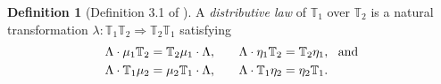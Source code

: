\documentclass[12pt,leqno]{amsart}
\theoremstyle{definition}
\newtheorem{definition}[theorem]{Definition}
\def\T{\mathbb{T}}
\newcommand{\4}{\texttt{4}}
\begin{document}
\begin{definition}[Definition 3.1 of \cite{fox-markl:ContM97}]
\label{Pujde dnes k ochotnikum?}
A {\/\em distributive law\/} of $\T_1$  over $\T_2$ is a natural
transformation   $\lambda :  \T_1   \T_2 \Rightarrow \T_2 \T_1$
satisfying
\begin{subequations}
\label{Jarka se vratila z Kolumbie.}
\begin{align}
\Lambda \cdot \mu_1\T_2 = \T_2 \mu_1 \cdot \Lambda, 
\hskip 2em
&\Lambda \cdot \eta_1\T_2 = \T_2 \eta_1, \ \hbox{ and}
\\
\Lambda \cdot \T_1\mu_2 = \mu_2 \T_1 \cdot \Lambda,
\hskip 2em
& \Lambda \cdot \T_1\eta_2 = \eta_2 \T_1.
  \end{align}
\end{subequations}
\end{definition}
\end{document}
